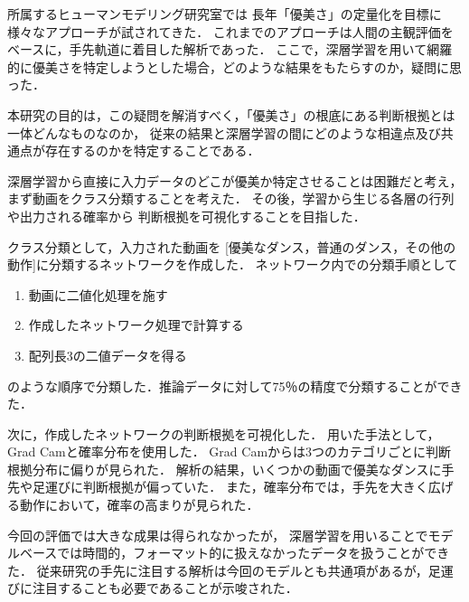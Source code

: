 所属するヒューマンモデリング研究室では
長年「優美さ」の定量化を目標に様々なアプローチが試されてきた．
これまでのアプローチは人間の主観評価をベースに，手先軌道に着目した解析であった．
ここで，深層学習を用いて網羅的に優美さを特定しようとした場合，どのような結果をもたらすのか，疑問に思った．

本研究の目的は，この疑問を解消すべく，「優美さ」の根底にある判断根拠とは一体どんなものなのか，
従来の結果と深層学習の間にどのような相違点及び共通点が存在するのかを特定することである．

深層学習から直接に入力データのどこが優美か特定させることは困難だと考え，
まず動画をクラス分類することを考えた．
その後，学習から生じる各層の行列や出力される確率から
判断根拠を可視化することを目指した．

クラス分類として，入力された動画を
[優美なダンス，普通のダンス，その他の動作]に分類するネットワークを作成した．
ネットワーク内での分類手順として
\begin{enumerate}
  \item 動画に二値化処理を施す
  \item 作成したネットワーク処理で計算する
  \item 配列長3の二値データを得る
\end{enumerate}
のような順序で分類した．推論データに対して75％の精度で分類することができた．

次に，作成したネットワークの判断根拠を可視化した．
用いた手法として，Grad Camと確率分布を使用した．
Grad Camからは3つのカテゴリごとに判断根拠分布に偏りが見られた．
解析の結果，いくつかの動画で優美なダンスに手先や足運びに判断根拠が偏っていた．
また，確率分布では，手先を大きく広げる動作において，確率の高まりが見られた．

今回の評価では大きな成果は得られなかったが，
深層学習を用いることでモデルベースでは時間的，フォーマット的に扱えなかったデータを扱うことができた．
従来研究の手先に注目する解析は今回のモデルとも共通項があるが，足運びに注目することも必要であることが示唆された．